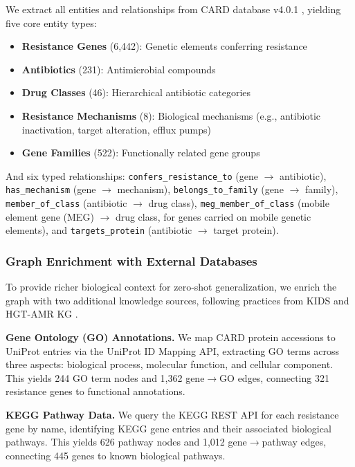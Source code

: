 \documentclass[conference]{IEEEtran}
\begin{document}
We extract all entities and relationships from CARD database v4.0.1 \cite{alcock2023card}, yielding five core entity types:

\begin{itemize}
\item \textbf{Resistance Genes} (6,442): Genetic elements conferring resistance
\item \textbf{Antibiotics} (231): Antimicrobial compounds
\item \textbf{Drug Classes} (46): Hierarchical antibiotic categories
\item \textbf{Resistance Mechanisms} (8): Biological mechanisms (e.g., antibiotic inactivation, target alteration, efflux pumps)
\item \textbf{Gene Families} (522): Functionally related gene groups
\end{itemize}

And six typed relationships: \texttt{confers\_resistance\_to} (gene $\to$ antibiotic), \texttt{has\_mechanism} (gene $\to$ mechanism), \texttt{belongs\_to\_family} (gene $\to$ family), \texttt{member\_of\_class} (antibiotic $\to$ drug class), \texttt{meg\_member\_of\_class} (mobile element gene (MEG) $\to$ drug class, for genes carried on mobile genetic elements), and \texttt{targets\_protein} (antibiotic $\to$ target protein).

\subsubsection{Graph Enrichment with External Databases}

To provide richer biological context for zero-shot generalization, we enrich the graph with two additional knowledge sources, following practices from KIDS \cite{youn2022kids} and HGT-AMR KG \cite{hgtamrkg2025}.

\textbf{Gene Ontology (GO) Annotations.} We map CARD protein accessions to UniProt entries via the UniProt ID Mapping API, extracting GO terms across three aspects: biological process, molecular function, and cellular component. This yields 244 GO term nodes and 1,362 gene$\to$GO edges, connecting 321 resistance genes to functional annotations.

\textbf{KEGG Pathway Data.} We query the KEGG REST API for each resistance gene by name, identifying KEGG gene entries and their associated biological pathways. This yields 626 pathway nodes and 1,012 gene$\to$pathway edges, connecting 445 genes to known biological pathways.
\end{document}
